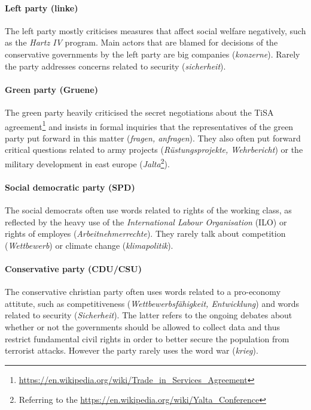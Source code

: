 \documentclass[runningheads,a4paper]{llncs}
\begin{document}
\paragraph{\bf Left party (linke)}
The left party mostly criticises measures that affect social welfare negatively, such as the {\em Hartz IV} program. Main actors that are blamed for decisions of the conservative governments by the left party are big companies ({\em konzerne}). Rarely the party addresses concerns related to security ({\em sicherheit}). 

\paragraph{\bf Green party (Gruene)}
The green party heavily criticised the secret negotiations about the TiSA agreement\footnote{\url{https://en.wikipedia.org/wiki/Trade_in_Services_Agreement}} and insists in formal inquiries that the representatives of the green party put forward in this matter ({\em fragen, anfragen}). They also often put forward critical questions related to army projects ({\em R\"ustungsprojekte, Wehrbericht}) or the military development in east europe ({\em  Jalta}\footnote{Referring to the \url{https://en.wikipedia.org/wiki/Yalta_Conference}}).

\paragraph{\bf Social democratic party (SPD)}
The social democrats often use words related to rights of the working class, as reflected by the heavy use of the {\em International Labour Organisation} (ILO) or rights of employes ({\em Arbeitnehmerrechte}). They rarely talk about competition ({\em Wettbewerb}) or climate change ({\em klimapolitik}). 

\paragraph{\bf Conservative party (CDU/CSU)}
The conservative christian party often uses words related to a pro-economy attitute, such as competitiveness ({\em Wettbewerbsf\"ahigkeit, Entwicklung}) and words related to security ({\em Sicherheit}). The latter refers to the ongoing debates about whether or not the governments should be allowed to collect data and thus restrict fundamental civil rights in order to better secure the population from terrorist attacks. However the party rarely uses the word war ({\em krieg}).
\end{document}
